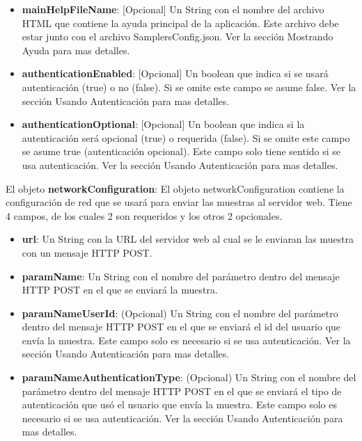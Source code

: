 \begin{itemize}
\begin{itemize}
		 \item \textbf{mainHelpFileName}: [Opcional] Un String con el nombre del archivo HTML que contiene la ayuda principal de la aplicación. Este archivo debe estar junto con el archivo SamplersConfig.json. Ver la sección Mostrando Ayuda para mas detalles.
		 
		 \item \textbf{authenticationEnabled}: [Opcional] Un boolean que indica si se usará autenticación (true) o no (false). Si se omite este campo se asume false. Ver la sección Usando Autenticación para mas detalles.
		 
		 \item \textbf{authenticationOptional}: [Opcional] Un boolean que indica si la autenticación será opcional (true) o requerida (false). Si se omite este campo se asume true (autenticación opcional). Este campo solo tiene sentido si se usa autenticación. Ver la sección Usando Autenticación para mas detalles.
		 
	\end{itemize}
	
	
	El objeto \textbf{networkConfiguration}:
	El objeto networkConfiguration contiene la configuración de red que se usará para enviar las muestras al servidor web. Tiene 4 campos, de los cuales 2 son requeridos y los otros 2 opcionales.
	
	\begin{itemize}
	
		\item \textbf{url}: Un String con la URL del servidor web al cual se le enviaran las muestra con un mensaje HTTP POST.
		
		\item \textbf{paramName}: Un String con el nombre del parámetro dentro del mensaje HTTP POST en el que se enviará la muestra.
	
		\item \textbf{paramNameUserId}: (Opcional) Un String con el nombre del parámetro dentro del mensaje HTTP POST en el que se enviará el id del usuario que envía la muestra. Este campo solo es necesario si se usa autenticación. Ver la sección Usando Autenticación para mas detalles.
		
		\item \textbf{paramNameAuthenticationType}: (Opcional) Un String con el nombre del parámetro dentro del mensaje HTTP POST en el que se enviará el tipo de autenticación que usó el usuario que envía la muestra. Este campo solo es necesario si se usa autenticación. Ver la sección Usando Autenticación para mas detalles.
	

\end{itemize}
\end{itemize}
